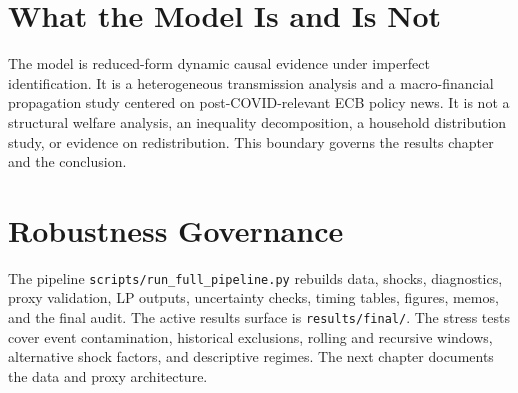 \section{What the Model Is and Is Not}

The model is reduced-form dynamic causal evidence under imperfect identification. It is a heterogeneous transmission analysis and a macro-financial propagation study centered on post-COVID-relevant ECB policy news. It is not a structural welfare analysis, an inequality decomposition, a household distribution study, or evidence on redistribution. This boundary governs the results chapter and the conclusion.

\section{Robustness Governance}

The pipeline \nolinkurl{scripts/run_full_pipeline.py} rebuilds data, shocks, diagnostics, proxy validation, LP outputs, uncertainty checks, timing tables, figures, memos, and the final audit. The active results surface is \nolinkurl{results/final/}. The stress tests cover event contamination, historical exclusions, rolling and recursive windows, alternative shock factors, and descriptive regimes. The next chapter documents the data and proxy architecture.
